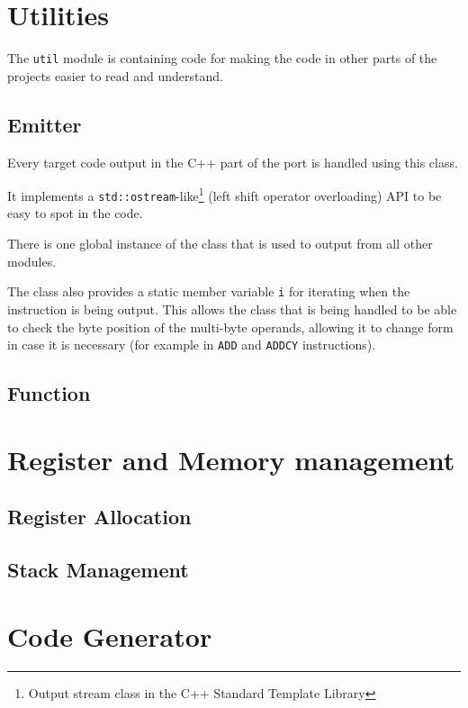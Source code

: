     \section{Utilities}

    The \texttt{util} module is containing code for making the code in other parts of the projects easier to read and understand.

        \subsection{Emitter}\label{emitter}

        Every target code output in the C++ part of the port is handled using this class.

        It implements a \texttt{std::ostream}-like\footnote{Output stream class in the C++ Standard Template Library} (left shift operator overloading) API to be easy to spot in the code.

        There is one global instance of the class that is used to output from all other modules.

        The class also provides a static member variable \texttt{i} for iterating when the instruction is being output. This allows the class that is being handled to be able to check the byte position of the multi-byte operands, allowing it to change form in case it is necessary (for example in \texttt{ADD} and \texttt{ADDCY} instructions).

        \subsection{Function}

        

    \section{Register and Memory management}

    

        \subsection{Register Allocation}

        \subsection{Stack Management}

    \section{Code Generator}

